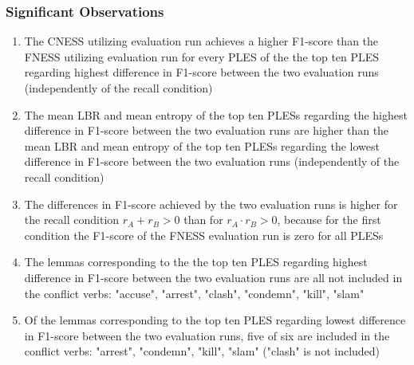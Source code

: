 \documentclass[11pt]{scrreprt}
\newcounter{listcounter}
\begin{document}
\subsubsection{Significant Observations}
\begin{enumerate}[label=\arabic{listcounter}.\arabic*]
	\item The CNESS utilizing evaluation run achieves a higher F1-score than the FNESS utilizing evaluation run for every PLES of the the top ten PLES regarding highest difference in F1-score between the two evaluation runs (independently of the recall condition) \label{obs-itm:CNESS-higher-f1-for-highest-f1-difference}
	\item The mean LBR and mean entropy of the top ten PLESs regarding the highest difference in F1-score between the two evaluation runs are higher than the mean LBR and mean entropy of the top ten PLESs regarding the lowest difference in F1-score between the two evaluation runs (independently of the recall condition) \label{obs-itm:PLES-more-diverse-for-highest-f1-difference}
	\item The differences in F1-score achieved by the two evaluation runs is higher for the recall condition \(r_A + r_B > 0\) than for \(r_A \cdot r_B > 0\), because for the first condition the F1-score of the FNESS evaluation run is zero for all PLESs \label{obs-itm:FNESS-zero-recall-highest-f1-difference}
	\item The lemmas corresponding to the the top ten PLES regarding highest difference in F1-score between the two evaluation runs are all not included in the conflict verbs: "accuse", "arrest", "clash", "condemn", "kill", "slam" \label{obs-itm:conflict-verbs-not-in-highest-f1-difference}
	\item Of the lemmas corresponding to  the top ten PLES regarding lowest difference in F1-score between the two evaluation runs, five of six are included in the conflict verbs: "arrest", "condemn", "kill", "slam" ("clash" is not included) \label{obs-itm:conflict-verbs-in-lowest-f1-difference}


\end{enumerate}
\end{document}
